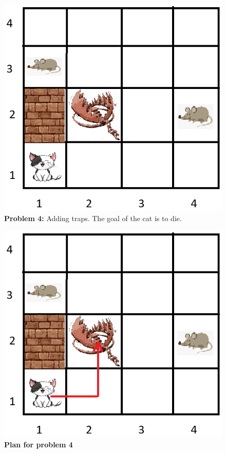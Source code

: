 \begin{multicols}{2}

\begin{figure}[H]
    \centering
    \includegraphics[width=\linewidth]{fig/A3/cat_04.png}
    \caption{\textbf{Problem 4:} Adding traps. The goal of the cat is to die.}
    \label{fig:cat_04}
\end{figure}

\columnbreak

\begin{figure}[H]
    \centering
    \includegraphics[width=\linewidth]{fig/A3/cat_04_sol.png}
    \caption{\textbf{Plan for problem 4}}
    \label{fig:cat_04_sol}
\end{figure}

\end{multicols}

